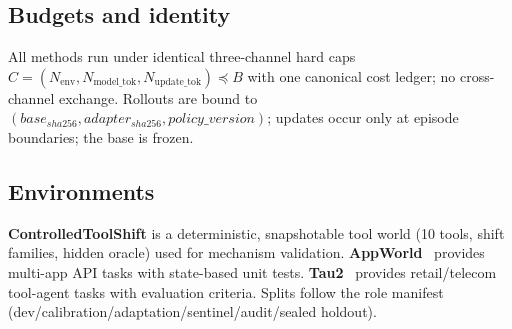 \subsection{Budgets and identity}
All methods run under identical three-channel hard caps
$C=(N_{\mathrm{env}},N_{\mathrm{model\_tok}},N_{\mathrm{update\_tok}})
\preceq B$ with one canonical cost ledger; no cross-channel exchange.
Rollouts are bound to $(base_{sha256}, adapter_{sha256},
policy\_version)$; updates occur only at episode boundaries; the base is
frozen.

\subsection{Environments}
\textbf{ControlledToolShift} is a deterministic, snapshotable tool world
(10 tools, shift families, hidden oracle) used for mechanism validation.
\textbf{AppWorld}~\cite{appworld2024} provides multi-app API tasks with
state-based unit tests. \textbf{Tau2}~\cite{tau2bench2025} provides
retail/telecom tool-agent tasks with evaluation criteria. Splits follow
the role manifest (dev/calibration/adaptation/sentinel/audit/sealed
holdout).
